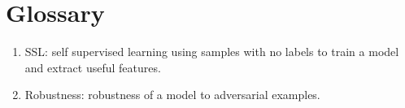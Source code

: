 \documentclass[../thesis.tex]{subfiles}
\begin{document}
\section{Glossary}
	
	\begin{enumerate}
		
		\item SSL: self supervised learning using samples with no labels to train a model and extract useful features. 
		
		\item Robustness: robustness of a model to adversarial examples.
		
		
	\end{enumerate}
	
\end{document}
